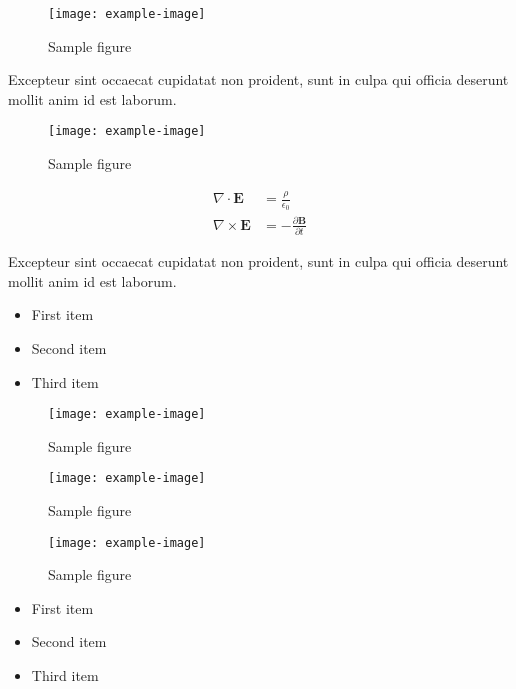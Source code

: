 \documentclass{article}
\begin{document}
\begin{figure}[h]
    \centering
    \texttt{[image: example-image]}
    \caption{Sample figure}
    \label{fig:sample}
\end{figure}

Excepteur sint occaecat cupidatat non proident, sunt in culpa qui officia deserunt mollit anim id est laborum.

\begin{figure}[h]
    \centering
    \texttt{[image: example-image]}
    \caption{Sample figure}
    \label{fig:sample}
\end{figure}

\begin{align}
    \nabla \cdot \mathbf{E} &= \frac{\rho}{\epsilon_0} \\
    \nabla \times \mathbf{E} &= -\frac{\partial \mathbf{B}}{\partial t}
\end{align}

Excepteur sint occaecat cupidatat non proident, sunt in culpa qui officia deserunt mollit anim id est laborum.

\begin{itemize}
\item First item
\item Second item
\item Third item
\end{itemize}

\begin{figure}[h]
    \centering
    \texttt{[image: example-image]}
    \caption{Sample figure}
    \label{fig:sample}
\end{figure}

\begin{figure}[h]
    \centering
    \texttt{[image: example-image]}
    \caption{Sample figure}
    \label{fig:sample}
\end{figure}

\begin{figure}[h]
    \centering
    \texttt{[image: example-image]}
    \caption{Sample figure}
    \label{fig:sample}
\end{figure}

\begin{itemize}
\item First item
\item Second item
\item Third item
\end{itemize}
\end{document}
